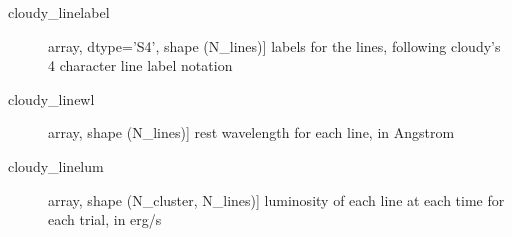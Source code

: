 \documentclass[letterpaper,10pt,english]{sphinxmanual}
\begin{document}
\begin{fulllineitems}
\begin{description}
\begin{description}
\item[{cloudy\_linelabel}] \leavevmode{[}array, dtype=’S4’, shape (N\_lines){]}
labels for the lines, following cloudy’s 4 character line label
notation

\item[{cloudy\_linewl}] \leavevmode{[}array, shape (N\_lines){]}
rest wavelength for each line, in Angstrom

\item[{cloudy\_linelum}] \leavevmode{[}array, shape (N\_cluster, N\_lines){]}
luminosity of each line at each time for each trial, in erg/s

\end{description}

\end{description}

\end{fulllineitems}

\end{document}
